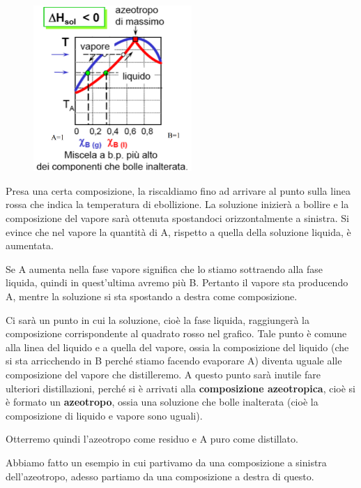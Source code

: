 \begin{minipage}{0.4\textwidth}
    \begin{figure}[H]
        \includegraphics[width=6cm]{immagini/distillazione_esotermica.png}
    \end{figure}
\end{minipage}
\begin{minipage}{0.6\textwidth}
    \vspace{0.6cm}Presa una certa composizione, la riscaldiamo fino ad arrivare al punto sulla linea rossa che indica la temperatura di ebollizione. La soluzione inizierà a bollire e la composizione del vapore sarà ottenuta spostandoci orizzontalmente a sinistra. Si evince che nel vapore la quantità di A, rispetto a quella della soluzione liquida, è aumentata.

    Se A aumenta nella fase vapore significa che lo stiamo sottraendo alla fase liquida, quindi in quest'ultima avremo più B. Pertanto il vapore sta producendo A, mentre la soluzione si sta spostando a destra come composizione.
\end{minipage}

\vspace{0.3cm}Ci sarà un punto in cui la soluzione, cioè la fase liquida, raggiungerà la composizione corrispondente al quadrato rosso nel grafico. Tale punto è comune alla linea del liquido e a quella del vapore, ossia la composizione del liquido (che si sta arricchendo in B perché stiamo facendo evaporare A) diventa uguale alle composizione del vapore che distilleremo. A questo punto sarà inutile fare ulteriori distillazioni, perché si è arrivati alla \textbf{composizione azeotropica}, cioè si è formato un \textbf{azeotropo}, ossia una soluzione che bolle inalterata (cioè la composizione di liquido e vapore sono uguali).

Otterremo quindi l'azeotropo come residuo e A puro come distillato.

Abbiamo fatto un esempio in cui partivamo da una composizione a sinistra dell'azeotropo, adesso partiamo da una composizione a destra di questo.

